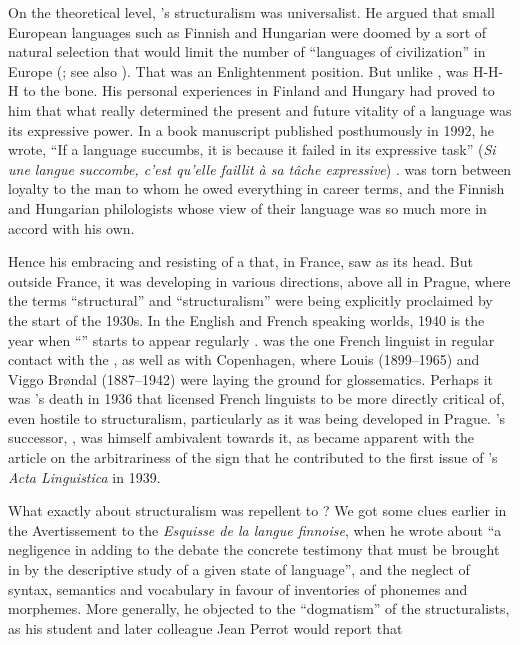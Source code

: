 \documentclass[output=paper]{langscibook}
\begin{document}
On the theoretical level, {\Meillet}'s structuralism was universalist. He argued that small European languages such as Finnish and Hungarian were doomed by a sort of natural selection that would limit the number of ``languages of civilization'' in Europe (\citealt[279]{Meillet1918}; see also \citealt[209--210]{Sauvageot2013}). That was an Enlightenment position. But unlike {\Meillet}, {\Sauvageot} was H-H-H to the bone. His personal experiences in Finland and Hungary had proved to him that what really determined the present and future vitality of a language was its expressive power. In a book manuscript published posthumously in 1992, he wrote, ``If a language succumbs, it is because it failed in its expressive task'' (\emph{Si une langue succombe, c'est qu'elle faillit à sa tâche expressive}) \citep[160]{Sauvageot1992}. {\Sauvageot} was torn between loyalty to the man to whom he owed everything in career terms, and the Finnish and Hungarian philologists whose view of their language was so much more in accord with his own.


Hence his embracing and resisting of a  that, in France, saw {\Meillet} as its head. But outside France, it was developing in various directions, above all in Prague, where the terms ``structural'' and ``structuralism'' were being explicitly proclaimed by the start of the 1930s. In the English and French speaking worlds, 1940 is the year when ``'' starts to appear regularly \citep[see][]{Joseph2015}. {\Martinet} was the one French linguist in regular contact with the {\PragueLinguisticCircle}, as well as with Copenhagen, where Louis {\Hjelmslev} (1899--1965) and Viggo Brøndal (1887--1942) were laying the ground for glossematics. Perhaps it was {\Meillet}'s death in 1936 that licensed French linguists to be more directly critical of, even hostile to structuralism, particularly as it was being developed in Prague. {\Meillet}'s successor, {\Benveniste}, was himself ambivalent towards it, as became apparent with the article on the arbitrariness of the sign that he contributed to the first issue of {\Hjelmslev}'s \emph{Acta Linguistica} in 1939.

What exactly about structuralism was repellent to {\Sauvageot}? We got some clues earlier in the Avertissement to the \emph{Esquisse de la langue finnoise}, when he wrote about ``a negligence in adding to the debate the concrete testimony that must be brought in by the descriptive study of a given state of language'', and the neglect of syntax, semantics and vocabulary in favour of inventories of phonemes and morphemes. More generally, he objected to the ``dogmatism'' of the structuralists, as his student and later colleague Jean Perrot would report that
\end{document}
